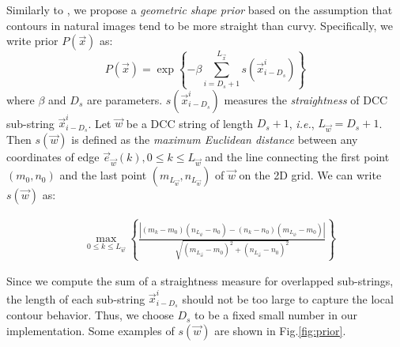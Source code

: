 Similarly to \cite{daribo14,zheng17}, we propose a \textit{geometric shape prior} based on the assumption that contours in natural images tend to be more straight than curvy.
Specifically, we write prior $P(\vec{x})$ as:
\begin{equation}
P(\vec{x}) = \exp\left\{- \beta \sum\limits_{i=D_s+1}^{L_{\vec{x}}} s(\vec{x}_{i-D_s}^{i})\right\}
\label{eq:geometric_prior}
\end{equation}
where $\beta$ and $D_s$ are parameters. 
$s(\vec{x}_{i-D_s}^i)$ measures the \textit{straightness} of DCC sub-string $\vec{x}_{i-D_s}^i$.
Let $\vec{w}$ be a DCC string of length $D_s+1$, \textit{i.e.}, $L_{\vec{w}}=D_s+1$. 
Then $s(\vec{w})$ is defined as the \textit{maximum Euclidean distance} between any coordinates of edge $\vec{e}_{\vec{w}}(k), 0\leq k \leq L_{\vec{w}}$ and the line connecting the first point $(m_0,n_0)$ and the last point $(m_{L_{\vec{w}}}, n_{L_{\vec{w}}})$ of $\vec{w}$ on the 2D grid.
We can write $s(\vec{w})$ as:

\vspace{-0.1in}
\begin{small}
\begin{equation}
\label{eq:straight}
\begin{split}
& \underset{0\! \leq k \leq L_{\vec{w}}}{\max}\left\{\!\frac{|(m_k\!-\!m_0)(n_{L_{\vec{w}}}\!-\!n_0)\!-\!(n_k\! -\! n_0)(m_{L_{\vec{w}}}\!-\!m_0) |}{\sqrt{(m_{L_{\vec{w}}}-m_0)^2+(n_{L_{\vec{w}}}-n_0)^2}} \! \right\}
\end{split}
\end{equation}
\end{small}

Since we compute the sum of a straightness measure for overlapped sub-strings, the length of each sub-string $\vec{x}_{i-D_s}^i$ should not be too large to capture the local contour behavior.
Thus, we choose $D_s$ to be a fixed small number in our implementation. 
Some examples of $s(\vec{w})$ are shown in Fig.\;\ref{fig:prior}. 



